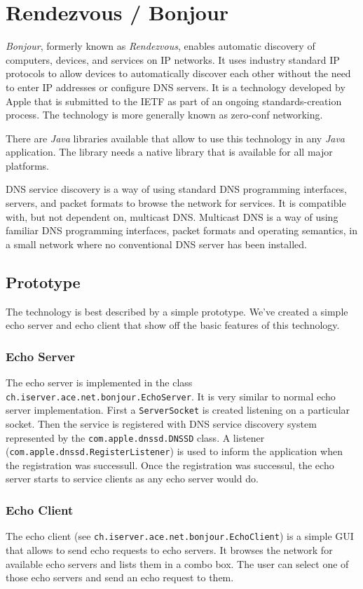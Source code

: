 \section{Rendezvous / Bonjour}
\emph{Bonjour}, formerly known as \emph{Rendezvous}, enables automatic discovery of computers, devices, and services on IP networks. It uses industry standard IP protocols to allow devices to automatically discover each other without the need to enter IP addresses or configure DNS servers. It is a technology developed by Apple that is submitted to the IETF as part of an ongoing standards-creation process. The technology is more generally known as zero-conf networking.

There are \emph{Java} libraries available that allow to use this technology in any \emph{Java} application. The library needs a native library that is available for all major platforms. 

DNS service discovery is a way of using standard DNS programming interfaces, servers, and packet formats to browse the network for services. It is compatible with, but not dependent on, multicast DNS. Multicast DNS is a way of using familiar DNS programming interfaces, packet formats and operating semantics, in a small network where no conventional DNS server has been installed.



\subsection{Prototype}
The technology is best described by a simple prototype. We've created a simple echo server and echo client that show off the basic features of this technology.

\subsubsection{Echo Server}
The echo server is implemented in the class \texttt{ch.iserver.ace.net.bonjour.EchoServer}. It is very similar to normal echo server implementation. First a \texttt{ServerSocket} is created listening on a particular socket. Then the service is registered with DNS service discovery system represented by the \texttt{com.apple.dnssd.DNSSD} class. A listener (\texttt{com.apple.dnssd.RegisterListener}) is used to inform the application when the registration was successull. Once the registration was successul, the echo server starts to service clients as any echo server would do.

\subsubsection{Echo Client}
The echo client (see \texttt{ch.iserver.ace.net.bonjour.EchoClient}) is a simple GUI that allows to send echo requests to echo servers. It browses the network for available echo servers and lists them in a combo box. The user can select one of those echo servers and send an echo request to them.

